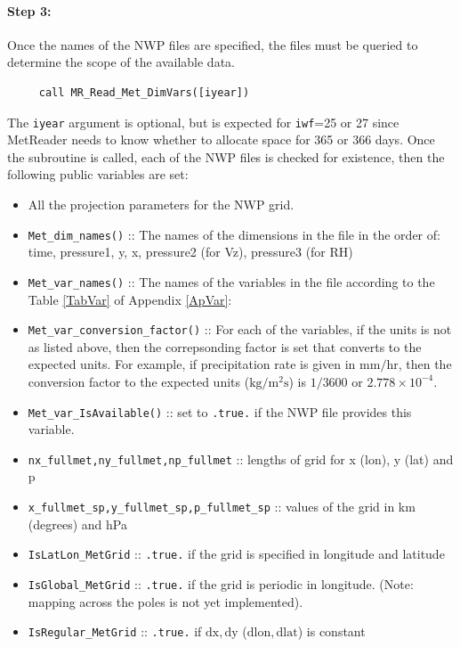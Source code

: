 \documentclass[11pt]{article}   %
\begin{document}
\paragraph{Step 3:} Once the names of the NWP files are specified, the files must
be queried to determine the scope of the available data.
\begin{verbatim}
     call MR_Read_Met_DimVars([iyear])
\end{verbatim}
The \texttt{iyear} argument is optional, but is expected for \texttt{iwf}=25 or 27
since MetReader needs to know whether to allocate space for 365 or 366 days.
Once the subroutine is called, each of the NWP files is checked for existence, then
the following public variables are set:
\begin{itemize}
\item All the projection parameters for the NWP grid.
\item \texttt{Met\_dim\_names()} :: The names of the dimensions in the file in the order of: time,
pressure1, y, x, pressure2 (for Vz), pressure3 (for RH)
\item \texttt{Met\_var\_names()} :: The names of the variables in the file according to the
Table \ref{TabVar} of Appendix \ref{ApVar}:
\item \texttt{Met\_var\_conversion\_factor()} :: For each of the variables, if the units
is not as listed above, then the correpsonding factor is set that converts to the
expected units.  For example, if precipitation rate is given in $\mathrm{mm/hr}$, then
the conversion factor to the expected units ($\mathrm{kg/m^2s}$) is $1/3600$ or
$2.778 \times 10^{-4}$.
\item \texttt{Met\_var\_IsAvailable()} :: set to \texttt{.true.} if the NWP file
provides this variable.
\item \texttt{nx\_fullmet,ny\_fullmet,np\_fullmet} :: lengths of grid for x (lon), y (lat) and p
\item \texttt{x\_fullmet\_sp,y\_fullmet\_sp,p\_fullmet\_sp} :: values of the grid in km (degrees) and hPa
\item \texttt{IsLatLon\_MetGrid} :: \texttt{.true.} if the grid is specified in longitude and latitude
\item \texttt{IsGlobal\_MetGrid} :: \texttt{.true.} if the grid is periodic in longitude.  (Note:
mapping across the poles is not yet implemented).
\item \texttt{IsRegular\_MetGrid} :: \texttt{.true.} if $\mathrm{dx,dy}$ ($\mathrm{dlon,dlat}$) is constant
\end{itemize}
\end{document}
